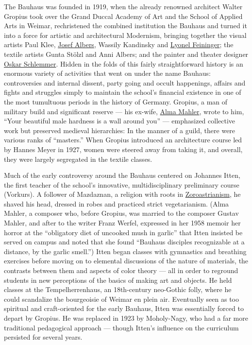 The Bauhaus was founded in 1919, when the already renowned architect
Walter Gropius took over the Grand Duccal Academy of Art and the School
of Applied Arts in Weimar, rechristened the combined institution the
Bauhaus and turned it into a force for artistic and architectural
Modernism, bringing together the visual artists Paul Klee,
\href{https://www.nytimes3xbfgragh.onion/2017/12/14/arts/design/josef-albers-mexico-guggenheim-museum-homage-to-the-square-mesoamerica.html}{Josef
Albers}, Wassily Kandinsky and
\href{https://www.nytimes3xbfgragh.onion/2011/07/22/arts/design/lyonel-feininger-show-at-the-whitney-review.html}{Lyonel
Feininger}; the textile artists Gunta Stölzl and Anni Albers; and the
painter and theater designer
\href{https://www.nytimes3xbfgragh.onion/1984/01/22/arts/dance-bauhaus-design-by-oskar-schlemmer.html}{Oskar
Schlemmer}. Hidden in the folds of this fairly straightforward history
is an enormous variety of activities that went on under the name
Bauhaus: controversies and internal dissent, party going and occult
happenings, affairs and fights and struggles simply to maintain the
school's financial existence in one of the most tumultuous periods in
the history of Germany. Gropius, a man of military build and significant
reserve --- his ex-wife,
\href{https://www.nytimes3xbfgragh.onion/1964/12/12/archives/alma-m-werfel-widow-of-writer-she-was-also-married-to-mahler-and.html}{Alma
Mahler}, wrote to him, ``Your beautiful male hardness is a wall around
you'' --- emphasized collective work but preserved medieval hierarchies:
In the manner of a guild, there were various ranks of ``masters.'' When
Gropius introduced an architecture course led by Hannes Meyer in 1927,
women were steered away from taking it, and overall, they were largely
segregated in the textile classes.

Much of the early controversy around the Bauhaus centered on Johannes
Itten, the first teacher of the school's innovative, multidisciplinary
preliminary course (Vorkurs). A follower of Mazdaznan, a religion with
roots in
\href{https://www.nytimes3xbfgragh.onion/2006/09/06/us/06faith.html}{Zoroastrianism},
he shaved his head, dressed in robes and practiced strict vegetarianism.
(Alma Mahler, a composer who, before Gropius, was married to the
composer Gustav Mahler, and after to the writer Franz Werfel, expressed
in her 1958 memoir her horror at the ``obligatory diet of uncooked mush
in garlic'' that Itten insisted be served on campus and noted that she
found ``Bauhaus disciples recognizable at a distance, by the garlic
smell.'') Itten began classes with gymnastics and breathing exercises
before moving on to elemental discussions of the nature of materials,
the contrasts between them and aspects of color theory --- all in order
to reground students in new perceptions of the basics of making art and
objects. He held classes at the Tempelherrenhaus, an 18th-century
neo-Gothic folly, where he could scandalize the bourgeoisie of Weimar en
plein air. Eventually seen as too spiritual and craft-oriented for the
early Bauhaus, Itten was essentially forced to depart by Gropius. He was
replaced in 1923 by Moholy-Nagy, who had a far more traditional
pedagogical approach --- though Itten's influence on the curriculum
persisted for several years.

